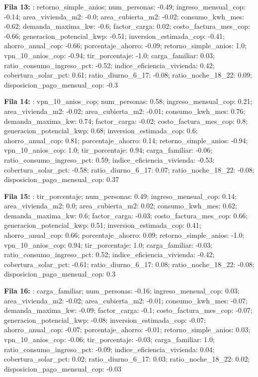 {\footnotesize\textbf{Fila 13:} : retorno\_simple\_anios; num\_personas: -0.49; ingreso\_mensual\_cop: -0.14; area\_vivienda\_m2: -0.0; area\_cubierta\_m2: -0.02; consumo\_kwh\_mes: -0.62; demanda\_maxima\_kw: -0.6; factor\_carga: 0.02; costo\_factura\_mes\_cop: -0.66; generacion\_potencial\_kwp: -0.51; inversion\_estimada\_cop: -0.41; ahorro\_anual\_cop: -0.66; porcentaje\_ahorro: -0.09; retorno\_simple\_anios: 1.0; vpn\_10\_anios\_cop: -0.94; tir\_porcentaje: -1.0; carga\_familiar: 0.03; ratio\_consumo\_ingreso\_pct: -0.52; indice\_eficiencia\_vivienda: 0.42; cobertura\_solar\_pct: 0.61; ratio\_diurno\_6\_17: -0.08; ratio\_noche\_18\_22: 0.09; disposicion\_pago\_mensual\_cop: -0.3\par}
{\footnotesize\textbf{Fila 14:} : vpn\_10\_anios\_cop; num\_personas: 0.58; ingreso\_mensual\_cop: 0.21; area\_vivienda\_m2: -0.02; area\_cubierta\_m2: -0.01; consumo\_kwh\_mes: 0.76; demanda\_maxima\_kw: 0.74; factor\_carga: -0.02; costo\_factura\_mes\_cop: 0.8; generacion\_potencial\_kwp: 0.68; inversion\_estimada\_cop: 0.6; ahorro\_anual\_cop: 0.81; porcentaje\_ahorro: 0.14; retorno\_simple\_anios: -0.94; vpn\_10\_anios\_cop: 1.0; tir\_porcentaje: 0.94; carga\_familiar: -0.06; ratio\_consumo\_ingreso\_pct: 0.59; indice\_eficiencia\_vivienda: -0.53; cobertura\_solar\_pct: -0.58; ratio\_diurno\_6\_17: 0.07; ratio\_noche\_18\_22: -0.08; disposicion\_pago\_mensual\_cop: 0.37\par}
{\footnotesize\textbf{Fila 15:} : tir\_porcentaje; num\_personas: 0.49; ingreso\_mensual\_cop: 0.14; area\_vivienda\_m2: 0.0; area\_cubierta\_m2: 0.02; consumo\_kwh\_mes: 0.62; demanda\_maxima\_kw: 0.6; factor\_carga: -0.03; costo\_factura\_mes\_cop: 0.66; generacion\_potencial\_kwp: 0.51; inversion\_estimada\_cop: 0.41; ahorro\_anual\_cop: 0.66; porcentaje\_ahorro: 0.09; retorno\_simple\_anios: -1.0; vpn\_10\_anios\_cop: 0.94; tir\_porcentaje: 1.0; carga\_familiar: -0.03; ratio\_consumo\_ingreso\_pct: 0.52; indice\_eficiencia\_vivienda: -0.42; cobertura\_solar\_pct: -0.61; ratio\_diurno\_6\_17: 0.08; ratio\_noche\_18\_22: -0.08; disposicion\_pago\_mensual\_cop: 0.3\par}
{\footnotesize\textbf{Fila 16:} : carga\_familiar; num\_personas: -0.16; ingreso\_mensual\_cop: 0.03; area\_vivienda\_m2: -0.02; area\_cubierta\_m2: -0.01; consumo\_kwh\_mes: -0.07; demanda\_maxima\_kw: -0.09; factor\_carga: -0.1; costo\_factura\_mes\_cop: -0.07; generacion\_potencial\_kwp: -0.08; inversion\_estimada\_cop: -0.07; ahorro\_anual\_cop: -0.07; porcentaje\_ahorro: -0.01; retorno\_simple\_anios: 0.03; vpn\_10\_anios\_cop: -0.06; tir\_porcentaje: -0.03; carga\_familiar: 1.0; ratio\_consumo\_ingreso\_pct: -0.09; indice\_eficiencia\_vivienda: 0.04; cobertura\_solar\_pct: 0.02; ratio\_diurno\_6\_17: 0.03; ratio\_noche\_18\_22: 0.02; disposicion\_pago\_mensual\_cop: -0.03\par}
